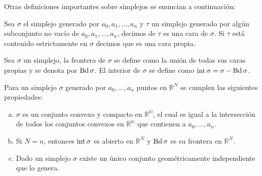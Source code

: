 %
Otras definiciones importantes sobre simplejos se enuncian a continuación:
\begin{Defi}
Sea $\sigma$ el simplejo generado por $a_0,a_1,\ldots,a_n$ y $\tau$ un simplejo generado por algún subconjunto no vacío de $a_0,a_1,\ldots,a_n$, decimos de $\tau$ es una cara de $\sigma$. Si $\tau$ está contenido estrictamente en $\sigma$ decimos que es una cara propia. 
\end{Defi}
\begin{Defi}
Sea $\sigma$ un simplejo, la frontera de $\sigma$ se define como la unión de todas sus caras propias y se denota por $\operatorname{Bd}\sigma$. El interior de $\sigma$ se define como  $\operatorname{int} \sigma = \sigma-\operatorname{Bd}\sigma$. 
\end{Defi}
\begin{Prop}
Para un simplejo $\sigma$ generado por $a_0,\ldots,a_n$ puntos en $\mathbb{R}^{N}$ se cumplen las siguientes propiedades:
\begin{enumerate}[(a)]
\item $\sigma$ es un conjunto convexo y compacto en $\mathbb{R^{N}}$, el cual es igual a la intersección de todos los conjuntos convexos en $\mathbb{R^{N}}$ que contienen a $a_0,\ldots,a_n$.
\item Si $N = n$, entonces $\operatorname{int} \sigma$ es abierto en $\mathbb{R}^N$ y $\operatorname{Bd} \sigma$ es su frontera en  $\mathbb{R}^N$.
\item Dado un simplejo $\sigma$ existe un único conjunto geométricamente independiente que lo genera.
\end{enumerate}
\end{Prop}
